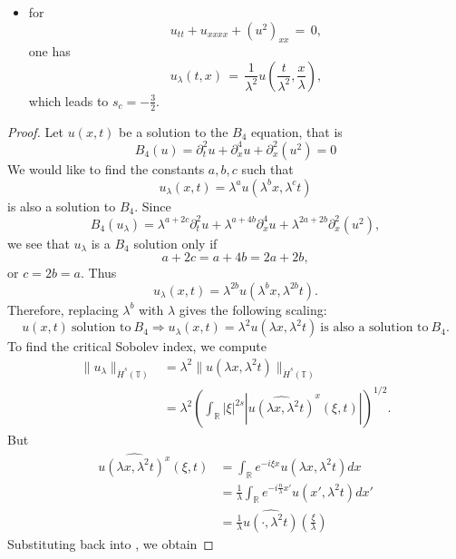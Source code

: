 \documentclass[12pt,reqno]{amsart}
\numberwithin{equation}{section}  %
\renewcommand{\cref}{\Cref}
\newcommand{\rr}{\mathbb{R}}
\newcommand{\ci}{\mathbb{T}}
\newcommand{\wh}{\widehat}
\begin{document}
\begin{appendices}
\begin{itemize}
  \item for 
    \[
    u_{tt}+u_{xxxx}+(u^2)_{xx}\,=\,0,
    \]
    one has 
    \[
    u_{\lambda}(t,x)\,=\,\frac{1}{\lambda^2}u\left(\frac{t}{\lambda^2}, \frac{x}{\lambda}\right),
    \]
    which leads to $s_c=-\frac 32$.
\end{itemize}
\begin{proof}
Let $u(x, t)$ be a solution to the $B_4$ equation, that is
%
$$
B_4(u)=
 \partial_t^2u + \partial^4_x u + \partial_x^2(u^2)  = 0
$$
%
We would like to find the constants
$a, b, c$ such that
\[
u_\lambda (x, t) = \lambda^a u(\lambda^b x, \lambda^c t)
\]
is also a solution to $B_4$.  Since 
$$
B_4(u_\lambda)=
\lambda^{a+2c} \partial_t^2u 
+
 \lambda^{a+4b} \partial^4_x u 
 +
  \lambda^{2a+2b}
  \partial_x^2(u^2),  
$$
we see that $u_\lambda$ is a $B_4$ solution only if
$$
a+2c=a+4b=2a+2b,
$$
or
$
c= 2b =a.
$
  Thus
\[
u_\lambda (x, t) = \lambda^{2b} u(\lambda^{b}x,  \lambda^{2b} t).
\]
%
%
Therefore, replacing  $\lambda^b$ with  $ \lambda$ gives the following scaling:
%
\begin{equation}
\label{DP-scal}
\boxed{u(x, t) \ \text{solution to} \  B_4
 \Longrightarrow 
u_\lambda (x, t) = \lambda^2 u(\lambda x, \lambda^2 t)  \ \text{is also a
solution to} \  B_4.}
\end{equation}
\label{rem:scaling}
To find the critical Sobolev index, we compute
%
%
\begin{equation}
\begin{split}
  \| u_{\lambda} \|_{\dot{H}^s(\ci)} 
  & = \lambda^{2} \| u(\lambda x, \lambda^2 t) \|_{\dot{H}^{s}(\ci)}
  \\
  & = \lambda^{2} \left( \int_{\rr} | \xi |^{2s} | \wh{u (\lambda x,
  \lambda^{2} t)}^x (\xi, t)| \right)^{1/2}.
\end{split}
\label{crit-ind-comp}
\end{equation}
%
But
%
%
\begin{equation*}
\begin{split}
  \wh{u(\lambda x, \lambda^{2}t)^x}(\xi, t)
  & = \int_{\rr}e^{-i\xi x}u(\lambda x, \lambda^2 t) dx
  \\
  & = \frac{1}{\lambda} \int_{\rr}e^{-i \frac{n}{\lambda} x'}u(x',
  \lambda^{2} t) dx'
  \\
  & = \frac{1}{\lambda} \wh{u(\cdot, \lambda^{2}t)}(\frac{\xi}{\lambda})
\end{split}
\end{equation*}
%
%
Substituting back into \cref{crit-ind-comp}, we obtain

\end{proof}
\end{appendices}
\end{document}
